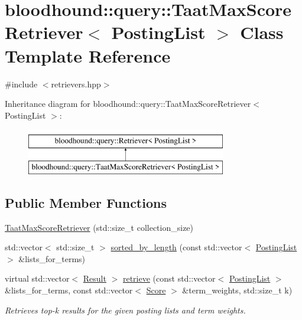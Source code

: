 \hypertarget{classbloodhound_1_1query_1_1TaatMaxScoreRetriever}{}\section{bloodhound\+:\+:query\+:\+:Taat\+Max\+Score\+Retriever$<$ Posting\+List $>$ Class Template Reference}
\label{classbloodhound_1_1query_1_1TaatMaxScoreRetriever}


{\ttfamily \#include $<$retrievers.\+hpp$>$}

Inheritance diagram for bloodhound\+:\+:query\+:\+:Taat\+Max\+Score\+Retriever$<$ Posting\+List $>$\+:\begin{figure}[H]
\begin{center}
\leavevmode
\includegraphics[height=2.000000cm]{classbloodhound_1_1query_1_1TaatMaxScoreRetriever}
\end{center}
\end{figure}
\subsection*{Public Member Functions}
\begin{DoxyCompactItemize}
\item 
\hyperlink{classbloodhound_1_1query_1_1TaatMaxScoreRetriever_a8f452aa87a82194bf337e4ce6a06c1f4}{Taat\+Max\+Score\+Retriever} (std\+::size\+\_\+t collection\+\_\+size)
\item 
std\+::vector$<$ std\+::size\+\_\+t $>$ \hyperlink{classbloodhound_1_1query_1_1TaatMaxScoreRetriever_a4c5253dee6541cf173f4f2e16803c702}{sorted\+\_\+by\+\_\+length} (const std\+::vector$<$ \hyperlink{classbloodhound_1_1PostingList}{Posting\+List} $>$ \&lists\+\_\+for\+\_\+terms)
\item 
virtual std\+::vector$<$ \hyperlink{structbloodhound_1_1query_1_1Result}{Result} $>$ \hyperlink{classbloodhound_1_1query_1_1TaatMaxScoreRetriever_af4d96478395b58527969526c3068e7b9}{retrieve} (const std\+::vector$<$ \hyperlink{classbloodhound_1_1PostingList}{Posting\+List} $>$ \&lists\+\_\+for\+\_\+terms, const std\+::vector$<$ \hyperlink{structbloodhound_1_1Score}{Score} $>$ \&term\+\_\+weights, std\+::size\+\_\+t k)
\begin{DoxyCompactList}\small\item\em Retrieves top-\/k results for the given posting lists and term weights. \end{DoxyCompactList}\end{DoxyCompactItemize}


